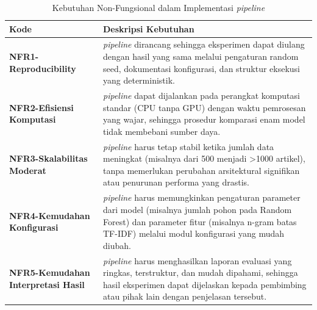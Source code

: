 \begin{table}[h!]
    \begin{tabular}{| p{3cm} | p{9cm} |}
    \hline
    \textbf{Kode} 
    & \textbf{Deskripsi Kebutuhan} \\
    \hline

    \textbf{NFR1-Reproducibility}
    & \textit{pipeline} dirancang sehingga eksperimen dapat diulang dengan hasil yang sama melalui pengaturan random seed, dokumentasi konfigurasi, dan struktur eksekusi yang deterministik. \\
    \hline
    
    \textbf{NFR2-Efisiensi Komputasi} 
    & \textit{pipeline} dapat dijalankan pada perangkat komputasi standar (CPU tanpa GPU) dengan waktu pemrosesan yang wajar, sehingga prosedur komparasi enam model tidak membebani sumber daya.\\

    \hline
    \textbf{NFR3-Skalabilitas Moderat} 
    & \textit{pipeline} harus tetap stabil ketika jumlah data meningkat (misalnya dari 500 menjadi >1000 artikel), tanpa memerlukan perubahan arsitektural signifikan atau penurunan performa yang drastis. \\

    \hline
    \textbf{NFR4-Kemudahan Konfigurasi} 
    & \textit{pipeline} harus memungkinkan pengaturan parameter dari model (misalnya jumlah pohon pada Random Forest) dan parameter fitur (misalnya n-gram batas TF-IDF) melalui modul konfigurasi yang mudah diubah. \\

    \hline
    \textbf{NFR5-Kemudahan Interpretasi Hasil} 
    & \textit{pipeline} harus menghasilkan laporan evaluasi yang ringkas, terstruktur, dan mudah dipahami, sehingga hasil eksperimen dapat dijelaskan kepada pembimbing atau pihak lain dengan penjelasan tersebut. \\
    \hline
    \end{tabular}
\caption{Kebutuhan Non-Fungsional dalam Implementasi \textit{pipeline}}
\label{tbl:kebutuhan-non-fungsional}
\end{table}